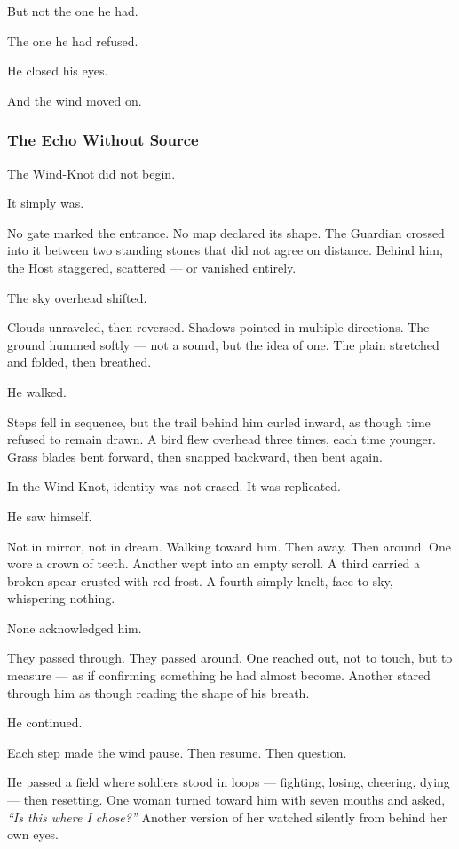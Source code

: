 \documentclass[12pt]{article}
\begin{document}
But not the one he had.

The one he had refused.

He closed his eyes.

And the wind moved on.

\dotfill

\subsubsection*{The Echo Without Source}

The Wind-Knot did not begin.

It simply was.

No gate marked the entrance. No map declared its shape. The Guardian crossed into it between two standing stones that did not agree on distance. Behind him, the Host staggered, scattered — or vanished entirely.

The sky overhead shifted.

Clouds unraveled, then reversed. Shadows pointed in multiple directions. The ground hummed softly — not a sound, but the idea of one. The plain stretched and folded, then breathed.

He walked.

Steps fell in sequence, but the trail behind him curled inward, as though time refused to remain drawn. A bird flew overhead three times, each time younger. Grass blades bent forward, then snapped backward, then bent again.

In the Wind-Knot, identity was not erased. It was replicated.

He saw himself.

Not in mirror, not in dream. Walking toward him. Then away. Then around. One wore a crown of teeth. Another wept into an empty scroll. A third carried a broken spear crusted with red frost. A fourth simply knelt, face to sky, whispering nothing.

None acknowledged him.

They passed through. They passed around. One reached out, not to touch, but to measure — as if confirming something he had almost become. Another stared through him as though reading the shape of his breath.

He continued.

Each step made the wind pause. Then resume. Then question.

He passed a field where soldiers stood in loops — fighting, losing, cheering, dying — then resetting. One woman turned toward him with seven mouths and asked, \textit{``Is this where I chose?''} Another version of her watched silently from behind her own eyes.
\end{document}

